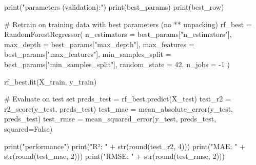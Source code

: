 print("\nBest parameters (validation):")
print(best_params)
print(best_row)

# Retrain on training data with best parameters (no ** unpacking)
rf_best = RandomForestRegressor(
    n_estimators = best_params["n_estimators"],
    max_depth = best_params["max_depth"],
    max_features = best_params["max_features"],
    min_samples_split = best_params["min_samples_split"],
    random_state = 42,
    n_jobs = -1
)

rf_best.fit(X_train, y_train)

# Evaluate on test set
preds_test = rf_best.predict(X_test)
test_r2 = r2_score(y_test, preds_test)
test_mae = mean_absolute_error(y_test, preds_test)
test_rmse = mean_squared_error(y_test, preds_test, squared=False)

print("\nTest performance")
print("R²:   " + str(round(test_r2, 4)))
print("MAE:  " + str(round(test_mae, 2)))
print("RMSE: " + str(round(test_rmse, 2)))